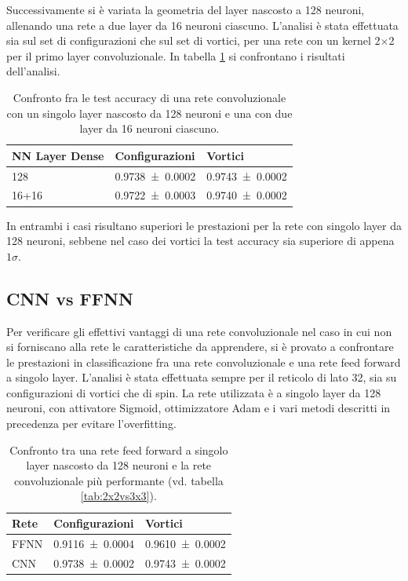 \documentclass{article}
\begin{document}
Successivamente si è variata la geometria del layer nascosto a 128 neuroni, allenando una rete a due layer da 16 neuroni ciascuno.
L'analisi è stata effettuata sia sul set di configurazioni che sul set di vortici, per una rete con un kernel 2$\times$2 per il primo layer convoluzionale.
In tabella \ref{tab:16x16} si confrontano i risultati dell'analisi.

\begin{table}[ht]
\begin{center}
\begin{tabular}{lll}
\toprule
NN Layer Dense & Configurazioni & Vortici \\
\midrule
128 &\num{0.9738 \pm 0.0002} & \num{0.9743 \pm 0.0002}\\
16+16 & \num{0.9722 \pm 0.0003} &\num{0.9740 \pm 0.0002}\\
\bottomrule
\end{tabular}
\end{center}
\caption{Confronto fra le test accuracy di una rete convoluzionale con un singolo layer nascosto da 128 neuroni e una con due layer da 16 neuroni ciascuno.}
\label{tab:16x16}
\end{table}

In entrambi i casi risultano superiori le prestazioni per la rete con singolo layer da 128 neuroni, sebbene nel caso dei vortici la test accuracy sia superiore di appena $1\sigma$.

\subsection{CNN vs FFNN}
Per verificare gli effettivi vantaggi di una rete convoluzionale nel caso in cui non si forniscano alla rete le caratteristiche da apprendere, si è provato a confrontare le prestazioni in classificazione fra una rete convoluzionale e una rete feed forward a singolo layer.
L'analisi è stata effettuata sempre per il reticolo di lato 32, sia su configurazioni di vortici che di spin.
La rete utilizzata è a singolo layer da 128 neuroni, con attivatore Sigmoid, ottimizzatore Adam e i vari metodi descritti in precedenza per evitare l'overfitting.

\begin{table}[ht]
\begin{center}
\begin{tabular}{lll}
\toprule
Rete & Configurazioni & Vortici \\
\midrule
FFNN &\num{0.9116 \pm 0.0004} & \num{0.9610 \pm 0.0002}\\
CNN & \num{0.9738 \pm 0.0002} & \num{0.9743 \pm 0.0002}\\
\bottomrule
\end{tabular}
\end{center}
\caption{Confronto tra una rete feed forward a singolo layer nascosto da 128 neuroni e la rete convoluzionale più performante (vd. tabella \ref{tab:2x2vs3x3}).}
\label{tab:FFNNvsCNN}
\end{table}
\end{document}
